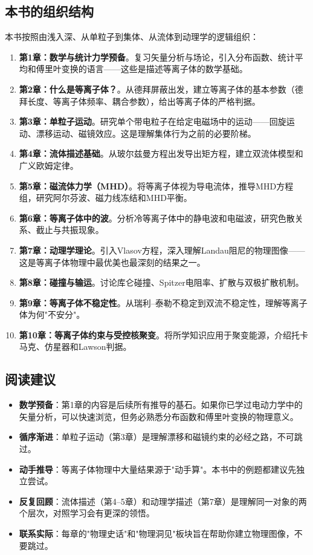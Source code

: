 \documentclass[12pt,a4paper,openany,oneside]{book}
\begin{document}
\subsection*{本书的组织结构}
本书按照由浅入深、从单粒子到集体、从流体到动理学的逻辑组织：
\begin{enumerate}
\item \textbf{第1章：数学与统计力学预备}。复习矢量分析与场论，引入分布函数、统计平均和傅里叶变换的语言——这些是描述等离子体的数学基础。
\item \textbf{第2章：什么是等离子体？}。从德拜屏蔽出发，建立等离子体的基本参数（德拜长度、等离子体频率、耦合参数），给出等离子体的严格判据。
\item \textbf{第3章：单粒子运动}。研究单个带电粒子在给定电磁场中的运动——回旋运动、漂移运动、磁镜效应。这是理解集体行为之前的必要阶梯。
\item \textbf{第4章：流体描述基础}。从玻尔兹曼方程出发导出矩方程，建立双流体模型和广义欧姆定律。
\item \textbf{第5章：磁流体力学（MHD）}。将等离子体视为导电流体，推导MHD方程组，研究阿尔芬波、磁力线冻结和MHD平衡。
\item \textbf{第6章：等离子体中的波}。分析冷等离子体中的静电波和电磁波，研究色散关系、截止与共振现象。
\item \textbf{第7章：动理学理论}。引入Vlasov方程，深入理解Landau阻尼的物理图像——这是等离子体物理中最优美也最深刻的结果之一。
\item \textbf{第8章：碰撞与输运}。讨论库仑碰撞、Spitzer电阻率、扩散与双极扩散机制。
\item \textbf{第9章：等离子体不稳定性}。从瑞利--泰勒不稳定到双流不稳定性，理解等离子体为何"不安分"。
\item \textbf{第10章：等离子体约束与受控核聚变}。将所学知识应用于聚变能源，介绍托卡马克、仿星器和Lawson判据。
\end{enumerate}

\subsection*{阅读建议}
\begin{itemize}
\item \textbf{数学预备}：第1章的内容是后续所有推导的基石。如果你已学过电动力学中的矢量分析，可以快速浏览，但务必熟悉分布函数和傅里叶变换的物理意义。
\item \textbf{循序渐进}：单粒子运动（第3章）是理解漂移和磁镜约束的必经之路，不可跳过。
\item \textbf{动手推导}：等离子体物理中大量结果源于"动手算"。本书中的例题都建议先独立尝试。
\item \textbf{反复回顾}：流体描述（第4--5章）和动理学描述（第7章）是理解同一对象的两个层次，对照学习会有更深的领悟。
\item \textbf{联系实际}：每章的"物理史话"和"物理洞见"板块旨在帮助你建立物理图像，不要跳过。
\end{itemize}
\end{document}
